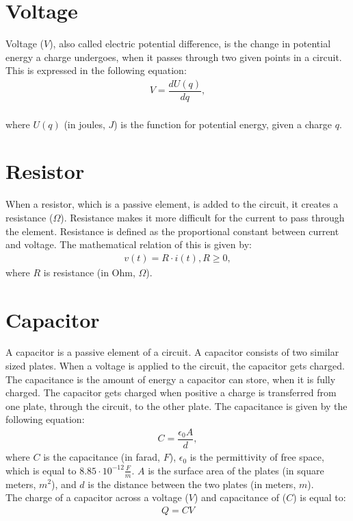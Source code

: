\section{Voltage}
Voltage ($V$), also called electric potential difference, is the change in potential energy a charge undergoes, when it passes through two given points in a circuit. This is expressed in the following equation:
\begin{align}
	V=\dfrac{dU(q)}{dq},
\end{align}
\\
where $U(q)$ (in joules, $J$) is the function for potential energy, given a charge $q$.
\section{Resistor}
When a resistor, which is a passive element, is added to the circuit, it creates a resistance ($\Omega$). Resistance makes it more difficult for the current to pass through the element. Resistance is defined as the proportional constant between current and voltage. The mathematical relation of this is given by:
\begin{align} 
\label{Ohm}
v(t)=R\cdot i(t),  R\geq0,
\end{align}
where $R$ is resistance (in Ohm, $\Omega$).
\section{Capacitor}
A capacitor is a passive element of a circuit. A capacitor consists of two similar sized plates. When a voltage is applied to the circuit, the capacitor gets charged. The capacitance is the amount of energy a capacitor can store, when it is fully charged. The capacitor gets charged when positive a charge is transferred from one plate, through the circuit, to the other plate. The capacitance is given by the following equation:
\begin{align*}
C=\dfrac{\epsilon_{0}A}{d},
\end{align*}
where $C$ is the capacitance (in farad, $F$), $\epsilon_{0}$ is the permittivity of free space, which is equal to $8.85 \cdot 10^{-12}                                                 \frac{F}{m}$. $A$ is the surface area of the plates (in square meters, $m^{2}$), and $d$ is the distance between the two plates (in meters, $m$).
\\
The charge of a capacitor across a voltage ($V$) and capacitance of ($C$) is equal to:
\begin{align}
\label{QCV}
Q=CV	
\end{align}
